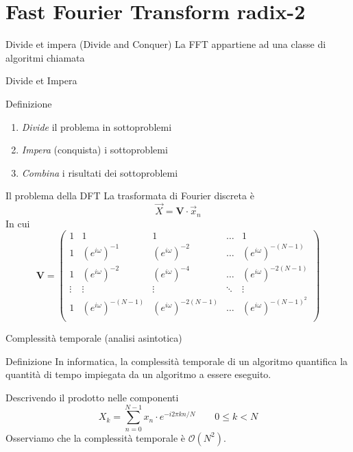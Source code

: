 \documentclass[10pt, xetex, handout]{beamer}
\begin{document}
\section{Fast Fourier Transform {\small radix-2}}
\begin{frame}{Divide et impera (Divide and Conquer)}
    La FFT appartiene ad una classe di algoritmi chiamata
    \begin{center}
        \Large Divide et Impera
    \end{center}

    \begin{block}{Definizione}
    \begin{enumerate}
        \item \emph{Divide} il problema in sottoproblemi
        \item \emph{Impera} (conquista) i sottoproblemi
        \item \emph{Combina} i risultati dei sottoproblemi
    \end{enumerate}
    \end{block}
\end{frame}

\begin{frame}{Il problema della DFT}
    La trasformata di Fourier discreta \`e
    \[
        \vec{X} = \mathbf{V}\cdot\vec{x}_n
    \]
    In cui
    \[
        \mathbf{V} = 
        \begin{pmatrix}
        1      & 1                      & 1                       & \dots  & 1                        \\[1em]
        1      & (e^{i\omega})^{-1}     & (e^{i\omega})^{-2}      & \dots  & (e^{i\omega})^{-(N-1)}   \\[1em]
        1      & (e^{i\omega})^{-2}     & (e^{i\omega})^{-4}      & \dots  & (e^{i\omega})^{-2(N-1)}  \\[1em]
        \vdots & \vdots                 &  \vdots                 & \ddots & \vdots                   \\[1em]
        1      & (e^{i\omega})^{-(N-1)} & (e^{i\omega})^{-2(N-1)} & \dots  & (e^{i\omega})^{-(N-1)^2} \\[1em]
        \end{pmatrix}
    \]
\end{frame}

\begin{frame}{Complessit\`a temporale (analisi asintotica)}
    \begin{block}{Definizione}
        In informatica, la complessità temporale di un algoritmo quantifica la
        quantità di tempo impiegata da un algoritmo a essere eseguito.
    \end{block}
    Descrivendo il prodotto nelle componenti
    \[
        X_k = \sum_{n=0}^{N-1} x_n\cdot e^{-i2\pi kn/N}
        \qquad 0 \leq k < N
    \]
    Osserviamo che la complessit\`a temporale \`e \(\mathcal{O}(N^2)\).
\end{frame}
\end{document}

